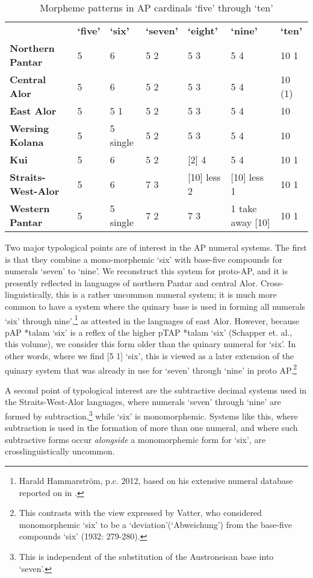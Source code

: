 {\begin{sidewaystable}


\begin{tabular}{lllllll}
 & {\bfseries `five'} & {\bfseries `six'} & {\bfseries `seven'} & {\bfseries `eight'} & {\bfseries `nine'} & {\bfseries `ten'}\\
{\bfseries Northern Pantar} & 5 & 6 & 5 2 & 5 3 & 5 4 & 10 1\\
{\bfseries Central Alor} & 5 & 6 & 5 2 & 5 3 & 5 4 & 10 (1)\\
{\bfseries East Alor} & 5 & 5 1 & 5 2 & 5 3 & 5 4 & 10\\
{\bfseries Wersing Kolana} & 5 & 5 single & 5 2 & 5 3 & 5 4 & 10\\
{\bfseries Kui} & 5 & 6 & 5 2 & [2] 4 & 5 4 & 10 1\\
{\bfseries Straits-West-Alor} & 5 & 6 & 7 3 & [10] less 2 & [10] less 1 & 10 1\\
{\bfseries Western Pantar} & 5 & 5 single & 7 2 & 7 3 & 1 take away  [10] & 10 1\\
\end{tabular}

\caption{Morpheme patterns in AP cardinals `five' through `ten'}
\end{sidewaystable}

Two major typological points are of interest in the AP numeral systems. The first is that they combine a mono-morphemic `six' with base-five compounds for numerals `seven' to `nine'. We reconstruct this system for proto-AP, and it is presently reflected in languages of northern Pantar and central Alor. Cross-linguistically, this is a rather uncommon numeral system; it is much more common to have a system where the quinary base is used in forming all numerals `six' through nine',\footnote{{}   Harald Hammarstr\"om, p.c. 2012, based on his extensive numeral database reported on in \citet{Hammarstrom2010}.} as attested in the languages of east Alor. However, because pAP *talam `six' is a reflex of the higher pTAP *talam `six' (Schapper et. al., this volume), we consider this form older than the quinary numeral for `six'. In other words, where we find [5 1] `six', this is viewed as a later extension of the quinary system that was already in use for `seven' through `nine' in proto AP.\footnote{{}   This contrasts with the view expressed by Vatter, who considered monomorphemic `six' to be a `deviation'(`Abweichung') from the base-five compounds `six' (1932: 279-280).}\nocite{Vatter1932}

A second point of typological interest are the subtractive decimal systems used in the Straits-West-Alor languages, where numerals `seven' through `nine' are formed by subtraction,\footnote{{}   This is independent of the substitution of the Austroneisan base into `seven'.} while `six' is monomorphemic. Systems like this, where subtraction is used in the formation of more than one numeral, and where such subtractive forms occur \textit{alongside} a monomorphemic form for `six', are crosslinguistically uncommon.

}
